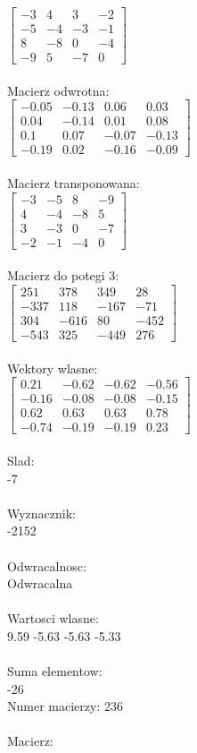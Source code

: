 \documentclass[a4paper,12pt]{article}
\begin{document}
$\begin{bmatrix} -3&4&3&-2\\-5&-4&-3&-1\\8&-8&0&-4\\-9&5&-7&0 \end{bmatrix}$
\\
\\
Macierz odwrotna:\\

$\begin{bmatrix} -0.05&-0.13&0.06&0.03\\0.04&-0.14&0.01&0.08\\0.1&0.07&-0.07&-0.13\\-0.19&0.02&-0.16&-0.09 \end{bmatrix}$
\\
\\
Macierz transponowana:\\

$\begin{bmatrix} -3&-5&8&-9\\4&-4&-8&5\\3&-3&0&-7\\-2&-1&-4&0 \end{bmatrix}$
\\
\\
Macierz do potegi 3:\\

$\begin{bmatrix} 251&378&349&28\\-337&118&-167&-71\\304&-616&80&-452\\-543&325&-449&276 \end{bmatrix}$
\\
\\
Wektory wlasne:\\

$\begin{bmatrix} 0.21&-0.62&-0.62&-0.56\\-0.16&-0.08&-0.08&-0.15\\0.62&0.63&0.63&0.78\\-0.74&-0.19&-0.19&0.23 \end{bmatrix}$
\\
\\
Slad:\\
-7
\\
\\
Wyznacznik:\\
-2152
\\
\\
Odwracalnosc:\\
Odwracalna
\\
\\
Wartosci wlasne:\\
9.59 -5.63 -5.63 -5.33
\\
\\
Suma elementow:\\
-26
\\
\newpage
Numer macierzy:
236
\\
\\
Macierz:\\
\end{document}
